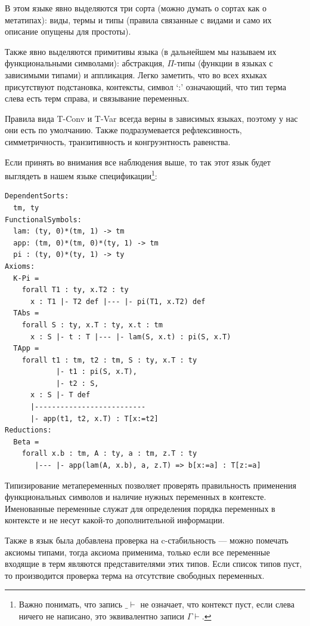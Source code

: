 В этом языке явно выделяются три сорта (можно думать о сортах как о метатипах): виды, термы и типы (правила связанные с видами и само их описание опущены для простоты).

Также явно выделяются примитивы языка (в дальнейшем мы называем их функциональными символами):
абстракция, $\Pi$-типы (функции в языках с зависимыми типами) и аппликация. Легко заметить, что во всех яхыках присутствуют подстановка, контексты, символ `:' означающий, что тип терма слева есть терм справа, и связывание переменных.

Правила вида T-Conv и T-Var всегда верны в зависимых языках, поэтому у нас они есть по умолчанию. Также подразумевается рефлексивность, симметричность, транзитивность и конгруэнтность равенства.

Если принять во внимания все наблюдения выше, то так этот язык будет выглядеть в нашем языке спецификации\footnote{Важно понимать, что запись $\_ \vdash$ не означает, что контекст пуст, если слева ничего не написано, это эквивалентно записи $\Gamma \vdash$.}:

\begin{lstlisting}[frame=single]
DependentSorts:
  tm, ty
FunctionalSymbols:
  lam: (ty, 0)*(tm, 1) -> tm
  app: (tm, 0)*(tm, 0)*(ty, 1) -> tm
  pi : (ty, 0)*(ty, 1) -> ty
Axioms:
  K-Pi =
    forall T1 : ty, x.T2 : ty
      x : T1 |- T2 def |--- |- pi(T1, x.T2) def
  TAbs =
    forall S : ty, x.T : ty, x.t : tm
      x : S |- t : T |--- |- lam(S, x.t) : pi(S, x.T)
  TApp =
    forall t1 : tm, t2 : tm, S : ty, x.T : ty
            |- t1 : pi(S, x.T),
            |- t2 : S,
      x : S |- T def
      |--------------------------
      |- app(t1, t2, x.T) : T[x:=t2]
Reductions:
  Beta =
    forall x.b : tm, A : ty, a : tm, z.T : ty
       |--- |- app(lam(A, x.b), a, z.T) => b[x:=a] : T[z:=a]
\end{lstlisting}

Типизирование метапеременных позволяет проверять правильность применения функциональных символов и наличие нужных переменных в контексте. Именованные переменные служат для определения порядка переменных в контексте и не несут какой-то дополнительной информации.

Также в язык была добавлена проверка на c-стабильность --- можно помечать аксиомы типами, тогда аксиома применима, только если все переменные входящие в терм являются представителями этих типов. Если список типов пуст, то производится проверка терма на отсутствие свободных переменных.


